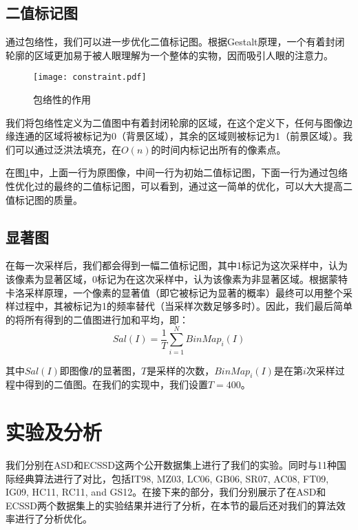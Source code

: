 \subsection{二值标记图}
通过包络性，我们可以进一步优化二值标记图。根据Gestalt原理\cite{beardslee1958readings}，一个有着封闭轮廓的区域更加易于被人眼理解为一个整体的实物，因而吸引人眼的注意力。

\begin{figure}
\centering
\texttt{[image: constraint.pdf]}
\caption{包络性的作用} \label{fig:constraint}
\end{figure}

我们将包络性定义为二值图中有着封闭轮廓的区域，在这个定义下，任何与图像边缘连通的区域将被标记为0（背景区域），其余的区域则被标记为1（前景区域）。我们可以通过泛洪法填充，在$O(n)$的时间内标记出所有的像素点。

在图\ref{fig:constraint}中，上面一行为原图像，中间一行为初始二值标记图，下面一行为通过包络性优化过的最终的二值标记图，可以看到，通过这一简单的优化，可以大大提高二值标记图的质量。

\subsection{显著图}
在每一次采样后，我们都会得到一幅二值标记图，其中1标记为这次采样中，认为该像素为显著区域，0标记为在这次采样中，认为该像素为非显著区域。根据蒙特卡洛采样原理，一个像素的显著值（即它被标记为显著的概率）最终可以用整个采样过程中，其被标记为1的频率替代（当采样次数足够多时）。因此，我们最后简单的将所有得到的二值图进行加和平均，即：
\begin{equation}
Sal(I) = \frac{1}{T}\sum_{i=1}^{N}BinMap_i(I)
\end{equation}

其中$Sal(I)$即图像$I$的显著图，$T$是采样的次数，$BinMap_i(I)$是在第$i$次采样过程中得到的二值图。在我们的实现中，我们设置$T=400$。

\section{实验及分析}
我们分别在ASD\cite{achanta2009frequency}和ECSSD\cite{yan2013hierarchical}这两个公开数据集上进行了我们的实验。同时与11种国际经典算法进行了对比，包括IT98\cite{itti1998model}, MZ03\cite{ma2003contrast}, LC06\cite{zhai2006visual}, GB06\cite{harel2006graph}, SR07\cite{hou2007saliency},  AC08\cite{achanta2008salient}, FT09\cite{achanta2009frequency},  IG09\cite{achanta2009frequency}, HC11\cite{cheng2011global}, RC11\cite{cheng2011global}, and GS12\cite{wei2012geodesic}。在接下来的部分，我们分别展示了在ASD和ECSSD两个数据集上的实验结果并进行了分析，在本节的最后还对我们的算法效率进行了分析优化。


